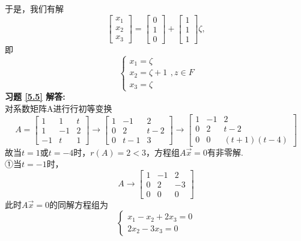 \documentclass[a4paper]{book}
\begin{document}
于是，我们有解
\begin{equation*}
\begin{bmatrix}
x_1\\x_2\\x_3
\end{bmatrix}
=\begin{bmatrix}0\\1\\0\end{bmatrix}+
\begin{bmatrix}1\\1\\1\end{bmatrix}\zeta,
\end{equation*}
即
\begin{equation*}
\begin{cases}
x_1=\zeta\\
x_2=\zeta+1\\
x_3=\zeta
\end{cases},
z\in F
\end{equation*}
\textbf{习题 \ref{5.5} 解答:}\\
对系数矩阵A进行行初等变换
\begin{equation*}
A= \begin{bmatrix}1&1&t\\1&-1&2\\-1&t&1\end{bmatrix}
   \rightarrow
   \begin{bmatrix}1&-1&2\\0&2&t-2\\0&t-1&3\end{bmatrix}
   \rightarrow
   \begin{bmatrix}1&-1&2\\0&2&t-2\\0&0&(t+1)(t-4)\end{bmatrix}
\end{equation*}
故当$t=1$或$t=-4$时，$r(A)=2<3$，方程组$A\vec{x}=0$有非零解.\\
①当$t=-1$时，
\begin{equation*}
A \rightarrow
   \begin{bmatrix}1&-1&2\\0&2&-3\\0&0&0\end{bmatrix}
\end{equation*}
此时$A\vec{x}=0$的同解方程组为
\begin{equation*}
\begin{cases}
x_1-x_2+2x_3=0\\
   2x_2-3x_3=0
\end{cases}
\end{equation*}
\end{document}
